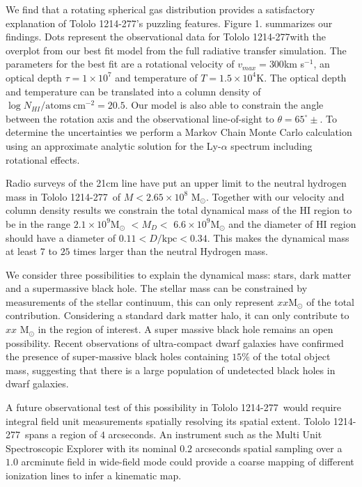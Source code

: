 \documentclass[a4paper, usenatbib, 12pt]{article}
\newcommand{\tol}{Tololo 1214-277}
\newcommand{\kms}{km s$^{-1}$}
\begin{document}
{We find that a rotating spherical gas distribution provides a
satisfactory explanation of \tol's puzzling features.  
Figure 1. summarizes our findings.
Dots represent the observational data for \tol with the
overplot from our best fit model from the full radiative transfer
simulation.   
The parameters for the best fit are a rotational velocity of
$v_{max}=300$\kms, an optical depth $\tau=1\times10^7$ and temperature
of $T=1.5\times 10^{4}$K.
The optical depth and temperature can be translated into a column
density of $\log N_{HI} / \mathrm{atoms\ cm}^{-2} =
  20.5$.   
Our model is also able to constrain the angle
between the rotation axis and the observational line-of-sight to
$\theta=65^{\circ}\pm$. 
To determine the uncertainties we perform a Markov Chain Monte
Carlo calculation using an approximate analytic solution for the
Ly-$\alpha$ spectrum including rotational effects.


Radio surveys of the 21cm line have put an upper limit to the neutral
hydrogen mass in \tol\ of $M<2.65\times 10^{8}$ M$_{\odot}$. 
Together with our velocity and column density results we constrain the
total dynamical mass of the HI region to be in the range $2.1\times
10^{9}$M$_{\odot}$ $<M_D<$  $6.6\times 10^{9}$M$_{\odot}$ and the
diameter of HI region should have a diameter of $0.11 <
D/\mathrm{kpc}<0.34$.  
This makes the dynamical mass  at least $7$ to $25$ times larger than
the neutral Hydrogen mass.  

We consider three possibilities to explain the dynamical 
mass: stars, dark matter and a supermassive black hole. 
The stellar mass can be constrained by measurements of the 
stellar continuum, this can only represent $xx$M$_{\odot}$ of the total
contribution. 
Considering a standard dark matter halo, it can only contribute to
$xx$ M$_{\odot}$ in the region of interest. 
A super massive black hole remains an open possibility. 
Recent observations of ultra-compact dwarf galaxies
\cite{Seth2014} have confirmed the presence of super-massive black
holes containing $15\%$ of the total object mass, suggesting that
there is a large population of undetected black holes in dwarf
galaxies.  

A future observational test of this possibility in \tol\ would require
integral field unit measurements spatially resolving its spatial
extent. 
\tol\ spans a region of $4$ arcseconds. 
An instrument such as the Multi Unit Spectroscopic Explorer with its
nominal $0.2$ arcseconds spatial sampling over a $1.0$ arcminute field
in wide-field mode could provide a coarse mapping of different
ionization lines to infer a kinematic map.

}
\end{document}
